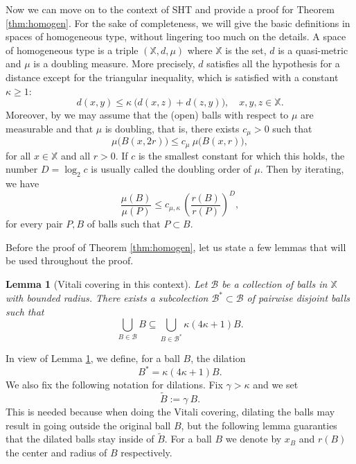 \documentclass[11pt,a4paper]{amsart}
\newtheorem{lemma}[theorem]{Lemma}
\theoremstyle{definition}
\theoremstyle{remark}
\numberwithin{equation}{section}
\numberwithin{equation}{section}
\begin{document}
Now we can move on to the context of SHT and provide a proof for Theorem \ref{thm:homogen}. 
For the sake of completeness, we will give the basic definitions in spaces of homogeneous type, without lingering too much on the details.
A space of homogeneous type is a triple $(\mathbb X,d,\mu)$ where $\mathbb X$ is the set, $d$ is a quasi-metric and $\mu$ is a doubling measure. More precisely, $d$ satisfies all the hypothesis for a distance except for the triangular inequality, which is satisfied with a constant $\kappa \geq 1$:
%
\[
d(x,y) \leq \kappa \: \big( d(x,z)+d(z,y) \big), \quad x,y,z \in \mathbb X.
\]
Moreover, by \cite{MS} we may assume that the (open) balls with respect to $\mu$ are measurable and that $\mu$ is doubling, that is, there exists $c_\mu>0$ such that 
%
\[
\mu\big(B(x,2r)\big) \leq c_\mu \: \mu\big( B(x,r)\big),
\]
for all $x\in \mathbb X$ and all $r>0$. If $c$ is the smallest constant for which this holds, the number $D = \log_2 c$ is usually called the doubling order of
$\mu$. Then by iterating, we have
%
\begin{equation}\label{reiterat}
\frac{\mu(B)}{\mu(P)} \leq
c_{\mu,\kappa}\,\left(\frac{r(B)}{r(P)}\right)^D, 
\end{equation}
%
for every pair $P, B$ of balls such that $P \subset
B$.





Before the proof of Theorem \ref{thm:homogen}, let us state a few lemmas that will be used throughout the proof.


\begin{lemma}[Vitali covering in this context]\label{lem:Vitali} Let $\mathcal B$ be a collection of balls in $\mathbb X$ with bounded radius. There exists a subcolection $\mathcal B^* \subset \mathcal B$ of pairwise disjoint balls such that 
%
\[
\bigcup_{B\in \mathcal B} B \subseteq \bigcup_{B \in \mathcal B^*} \kappa (4\kappa +1) B.
\]
%
\end{lemma}
%
In view of Lemma \ref{lem:Vitali}, we define, for a ball $B$, the dilation
%
\[
B^* = \kappa ( 4\kappa +1) B.
\]
%
We also fix the following notation for dilations. Fix $\gamma>\kappa$ and we set
%
\[
\tilde B := \gamma \ B.
\]
%
This is needed because when doing the Vitali covering, dilating the balls may result in going outside the original ball $B$, but the following lemma guaranties that the dilated balls stay inside of $\tilde B$. For a ball $B$ we denote by $x_B$ and $r(B)$ the center and radius of $B$  respectively.
\end{document}
